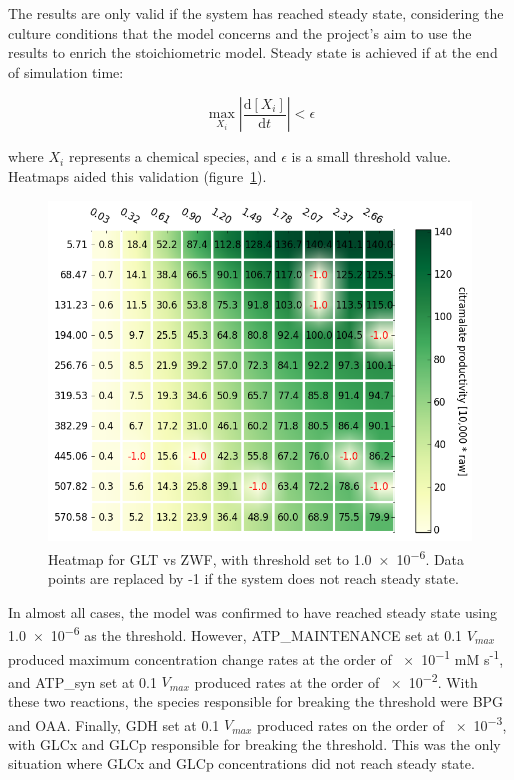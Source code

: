 \documentclass[parskip=full, numbers=noenddot]{scrreprt}
\begin{document}
The results are only valid if the system has reached steady state, considering the culture conditions that the model concerns and the project's aim to use the results to enrich the stoichiometric model. Steady state is achieved if at the end of simulation time:

\begin{equation}
  \max_{X_{i}} \left | \frac{\mathrm{d}[X_{i}]}{\mathrm{d}t} \right | < \epsilon
\end{equation}
\label{eqn:steadystate}

where $X_{i}$ represents a chemical species, and $\epsilon$ is a small threshold value. Heatmaps aided this validation (figure~\ref{fig:steadystate}).

\begin{figure}[hbp]
  \centering
  \includegraphics[scale=0.5]{steadystate}
  \caption{Heatmap for GLT vs ZWF, with threshold set to \num{1.0e-6}. Data points are replaced by -1 if the system does not reach steady state.}
  \label{fig:steadystate}
\end{figure}


In almost all cases, the model was confirmed to have reached steady state using \num{1.0e-6} as the threshold. However, ATP\_MAIN\-TEN\-ANCE set at 0.1 $V_{max}$ produced maximum concentration change rates at the order of \num{e-1} mM s\textsuperscript{-1}, and ATP\_syn set at 0.1 $V_{max}$ produced rates at the order of \num{e-2}. With these two reactions, the species responsible for breaking the threshold were BPG and OAA.
Finally, GDH set at 0.1 $V_{max}$ produced rates on the order of \num{e-3}, with GLCx and GLCp responsible for breaking the threshold. This was the only situation where GLCx and GLCp concentrations did not reach steady state.
\end{document}

